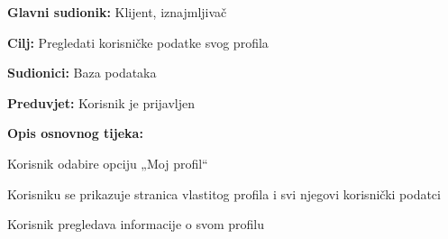 						\begin{packed_item}
							
							\item \textbf{Glavni sudionik: } Klijent, iznajmljivač
							\item  \textbf{Cilj:} Pregledati korisničke podatke svog profila
							\item  \textbf{Sudionici:} Baza podataka
							\item  \textbf{Preduvjet:} Korisnik je prijavljen
							\item  \textbf{Opis osnovnog tijeka:}
							
							\item[] \begin{packed_enum}
								
								\item Korisnik odabire opciju „Moj profil“ 
								\item Korisniku se prikazuje stranica vlastitog profila i svi njegovi korisnički podatci   
								\item Korisnik pregledava informacije o svom profilu 
							 
							\end{packed_enum}
						\end{packed_item}
						\noindent {}
